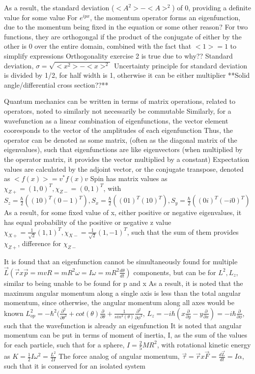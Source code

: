 \documentclass[11 pt, twoside]{article}
\newenvironment{outline*}
{
	\begin{outline}[enumerate]
	}
	{\end{outline}
}
\begin{document}
\begin{outline*}
	\2 As a result, the standard deviation ($<A^2> - <A>^2$) of 0, providing a definite value for some value
	\2 For $e^{ipx}$, the momentum operator forms an eigenfunction, due to the momentum being fixed in the equation or some other reason?
\1 For two functions, they are orthogongal if the product of the conjugate of either by the other is 0 over the entire domain, combined with the fact that $<1> = 1$ to simplify expressions
	\2 Orthogonality exercise 2 is true due to why??
\1 Standard deviation, $\sigma = \sqrt{<x^2> - <x>^2}$
\1 Uncertainty principle for standard deviation is divided by 1/2, for half width is 1, otherwise it can be either multiplier
\1 **Solid angle/differential cross section??**

\1 Quantum mechanics can be written in terms of matrix operations, related to operators, noted to similarly not necessarily be commutable
	\2 Similarly, for a wavefunction as a linear combination of eigenfunctions, the vector element cooresponds to the vector of the amplitudes of each eigenfunction
	\2 Thus, the operator can be denoted as some matrix, (often as the diagonal matrix of the eigenvalues), such that eigenfunctions are like eigenvectors (when multiplied by the operator matrix, it provides the vector multiplied by a constant)
	\2 Expectation values are calculated by the adjoint vector, or the conjugate transpose, denoted as $<f(x)> = v^*f(x)v$
	\2 Spin has matrix values as $\chi_{Z+} = (1, 0)^T, \chi_{Z-} = (0, 1)^T$, with $S_z = \frac{\hbar}{2}((1 0)^T (0 -1)^T), S_x = \frac{\hbar}{2}((0 1)^T (1 0)^T), S_y = \frac{\hbar}{2}((0 i)^T (-i 0)^T)$
		\3 As a result, for some fixed value of x, either positive or negative eigenvalues, it has equal probability of the positive or negative z value
		\3 $\chi_{X+} = \frac{1}{\sqrt{2}}(1, 1)^T, \chi_{X-} = \frac{1}{\sqrt{2}}(1, -1)^T$, such that the sum of them provides $\chi_{Z+}$, difference for $\chi_{Z-}$

\1 It is found that an eigenfunction cannot be simultaneously found for multiple $\vec{L} (\vec{r} x \vec{p} = mvR = mR^2\omega = I\omega = mR^2\frac{d\theta}{dt})$ components, but can be for $L^2, L_z$, similar to being unable to be found for p and x
	\2 As a result, it is noted that the maximum angular momentum along a single axis is less than the total angular momentum, since otherwise, the angular momentum along all axes would be known
	\2 $L^2_{op} = -\hbar^2(\frac{\partial^2}{\partial \theta^2} + cot(\theta)\frac{\partial}{\partial \theta} + \frac{1}{sin^2(\theta)}\frac{\partial^2}{\partial \phi^2}$, $L_z = -i\hbar(x\frac{\partial}{\partial y} - y\frac{\partial}{\partial x}) = -i\hbar\frac{\partial}{\partial \phi}$, such that the wavefunction is already an eigenfunction
	\2 It is noted that angular momentum can be put in terms of moment of inertia, I, as the sum of the values for each particle, such that for a sphere, $I = \frac{2}{5}MR^2$, with rotational kinetic energy as $K = \frac{1}{2}I\omega^2 = \frac{L^2}{2I}$
	\2 The force analog of angular momentum, $\vec{\tau} = \vec{r} x \vec{F} = \frac{d\vec{L}}{dt} = I\alpha$, such that it is conserved for an isolated system


\end{outline*}
\end{document}
